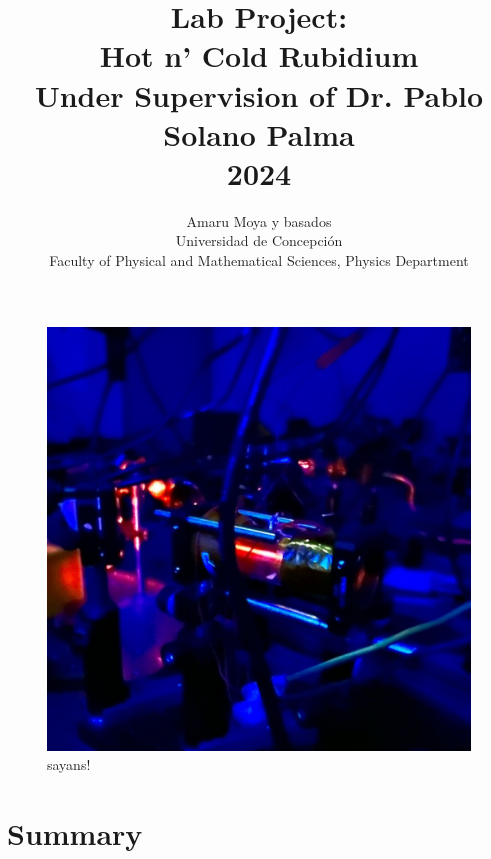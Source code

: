 \documentclass[10pt]{article}
\title{Lab Project:\\ \textbf{Hot n' Cold Rubidium}\\\Large{ Under Supervision of Dr. Pablo Solano Palma \\ 2024}}
\author{Amaru Moya y basados \\ Universidad de Concepción\\ Faculty of Physical and Mathematical Sciences, Physics Department}
\begin{document}
\maketitle
\thispagestyle{fancy}

\begin{figure}[h]
    \centering
    \includegraphics[width=.5\linewidth]{img/resonancia.jpeg}
    \caption{sayans! }
    \label{fig:portada}
\end{figure}

\clearpage
\tableofcontents

\clearpage
\fancyfoot[C]{\thepage}






\section*{Summary}

\end{document}
